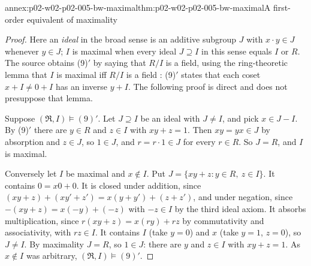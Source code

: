 \begin{annexitem}{annex:p02-w02-p02-005-bw-maximal}{thm:p02-w02-p02-005-bw-maximal}{A first-order equivalent of maximality}
\begin{proof}
Here an \emph{ideal} in the broad sense is an additive subgroup \(J\) with
\(x\cdot y\in J\) whenever \(y\in J\); \(I\) is maximal when every ideal
\(J\supseteq I\) in this sense equals \(I\) or \(R\).  The source obtains
(9)\('\) by saying that \(R/I\) is a field, using the ring-theoretic lemma
that \(I\) is maximal iff \(R/I\) is a field
\cite[ch.~A.1, \S2, p.~14]{Barwise1977FirstOrder}: (9)\('\) states that
each coset \(x+I\neq0+I\) has an inverse \(y+I\).  The following proof is
direct and does not presuppose that lemma.

Suppose \((\mathfrak R,I)\models(9)'\).  Let \(J\supseteq I\) be an
ideal with \(J\neq I\), and pick \(x\in J-I\).  By (9)\('\) there are
\(y\in R\) and \(z\in I\) with \(xy+z=1\).  Then \(xy=yx\in J\) by
absorption and \(z\in J\), so \(1\in J\), and \(r=r\cdot1\in J\) for
every \(r\in R\).  So \(J=R\), and \(I\) is maximal.

Conversely let \(I\) be maximal and \(x\notin I\).  Put
\(J=\{xy+z:y\in R,\ z\in I\}\).  It contains \(0=x0+0\).  It is closed
under addition, since \((xy+z)+(xy'+z')=x(y+y')+(z+z')\), and under
negation, since \(-(xy+z)=x(-y)+(-z)\) with \(-z\in I\) by the third ideal
axiom.  It absorbs multiplication, since
\(r(xy+z)=x(ry)+rz\) by commutativity and associativity, with
\(rz\in I\).  It contains \(I\) (take \(y=0\)) and \(x\) (take \(y=1\),
\(z=0\)), so \(J\neq I\).  By maximality \(J=R\), so \(1\in J\): there are
\(y\) and \(z\in I\) with \(xy+z=1\).  As \(x\notin I\) was arbitrary,
\((\mathfrak R,I)\models(9)'\).
\end{proof}
\end{annexitem}

